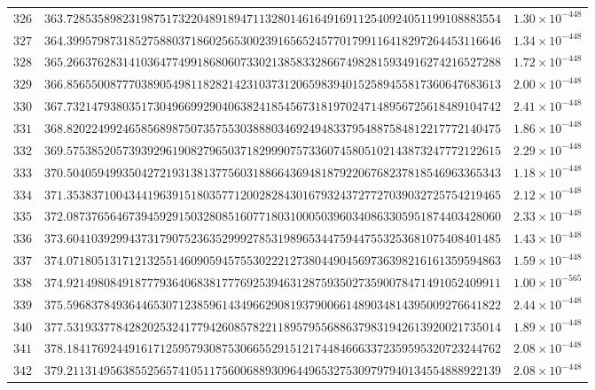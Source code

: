 \documentclass[12pt,reqno]{amsart}
\theoremstyle{remark}
\begin{document}
\begin{longtable}{clc}
$326$ & $363.7285358982319875173220489189471132801461649169112540924051199108883554$ & $1.30\times 10^{-448}$ \\
$327$ & $364.3995798731852758803718602565300239165652457701799116418297264453116646$ & $1.34\times 10^{-448}$ \\
$328$ & $365.2663762831410364774991868060733021385833286674982815934916274216527288$ & $1.72\times 10^{-448}$ \\
$329$ & $366.8565500877703890549811828214231037312065983940152589455817360647683613$ & $2.00\times 10^{-448}$ \\
$330$ & $367.7321479380351730496699290406382418545673181970247148956725618489104742$ & $2.41\times 10^{-448}$ \\
$331$ & $368.8202249924658568987507357553038880346924948337954887584812217772140475$ & $1.86\times 10^{-448}$ \\
$332$ & $369.5753852057393929619082796503718299907573360745805102143873247772122615$ & $2.29\times 10^{-448}$ \\
$333$ & $370.5040594993504272193138137756031886643694818792206768237818546963365343$ & $1.18\times 10^{-448}$ \\
$334$ & $371.3538371004344196391518035771200282843016793243727727039032725754219465$ & $2.12\times 10^{-448}$ \\
$335$ & $372.0873765646739459291503280851607718031000503960340863305951874403428060$ & $2.33\times 10^{-448}$ \\
$336$ & $373.6041039299437317907523635299927853198965344759447553253681075408401485$ & $1.43\times 10^{-448}$ \\
$337$ & $374.0718051317121325514609059457553022212738044904569736398216161359594863$ & $1.59\times 10^{-448}$ \\
$338$ & $374.9214980849187779364068381777692539463128759350273590078471491052409911$ & $1.00\times 10^{-565}$ \\
$339$ & $375.5968378493644653071238596143496629081937900661489034814395009276641822$ & $2.44\times 10^{-448}$ \\
$340$ & $377.5319337784282025324177942608578221189579556886379831942613920021735014$ & $1.89\times 10^{-448}$ \\
$341$ & $378.1841769244916171259579308753066552915121744846663372359595320723244762$ & $2.08\times 10^{-448}$ \\
$342$ & $379.2113149563855256574105117560068893096449653275309797940134554888922139$ & $2.08\times 10^{-448}$ \\

\end{longtable}
\end{document}
